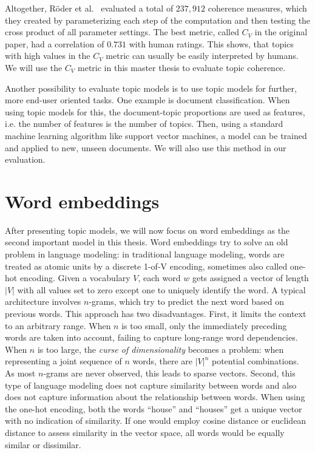 \documentclass[
        a4paper,
        titlepage,
        twoside,
        parskip,
        numbers=noenddot
        ]{scrbook}
\theoremstyle{break}
\begin{document}
Altogether, Röder et al.~\cite{Roder2015} evaluated a total of $237,912$ coherence measures, which they created by parameterizing each step of the computation and then testing the cross product of all parameter settings.
The best metric, called $C_V$ in the original paper, had a correlation of $0.731$ with human ratings.
This shows, that topics with high values in the $C_V$ metric can usually be easily interpreted by humans.
We will use the $C_V$ metric in this master thesis to evaluate topic coherence.

Another possibility to evaluate topic models is to use topic models for further, more end-user oriented tasks.
One example is document classification.
When using topic models for this, the document-topic proportions are used as features, i.e. the number of features is the number of topics.
Then, using a standard machine learning algorithm like support vector machines, a model can be trained and applied to new, unseen documents.
We will also use this method in our evaluation.

\section{Word embeddings}

After presenting topic models, we will now focus on word embeddings as the second important model in this thesis.
Word embeddings try to solve an old problem in language modeling:
in traditional language modeling, words are treated as atomic units by a discrete 1-of-V encoding, sometimes also called one-hot encoding.
Given a vocabulary $V$, each word $w$ gets assigned a vector of length $|V|$ with all values set to zero except one to uniquely identify the word.
A typical architecture involves $n$-grams, which try to predict the next word based on previous words.
This approach has two disadvantages.
First, it limits the context to an arbitrary range.
When $n$ is too small, only the immediately preceding words are taken into account, failing to capture long-range word dependencies.
When $n$ is too large, the \emph{curse of dimensionality} becomes a problem: when representing a joint sequence of $n$ words, there are $|V|^n$ potential combinations.
As most $n$-grams are never observed, this leads to sparse vectors.
Second, this type of language modeling does not capture similarity between words and also does not capture information about the relationship between words.
When using the one-hot encoding, both the words ``house'' and ``houses'' get a unique vector with no indication of similarity.
If one would employ cosine distance or euclidean distance to assess similarity in the vector space, all words would be equally similar or dissimilar.
\end{document}
